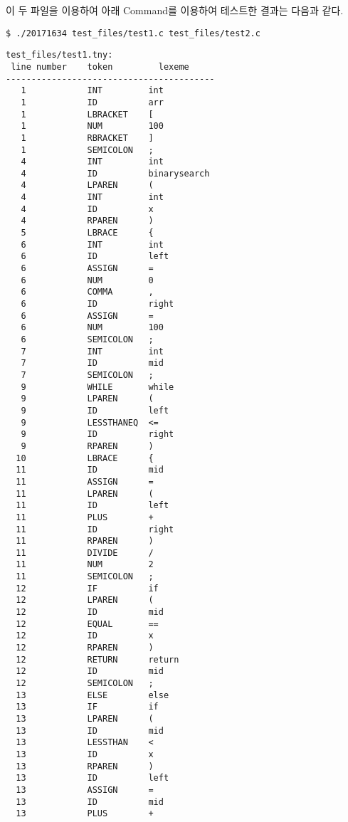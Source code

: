 \documentclass[a4paper, 10pt]{oblivoir}
\begin{document}



이 두 파일을 이용하여 아래 Command를 이용하여 테스트한 결과는 다음과 같다.
\begin{lstlisting}
$ ./20171634 test_files/test1.c test_files/test2.c
\end{lstlisting}

\begin{lstlisting}[caption=Output, frame=single]
test_files/test1.tny:
 line number    token         lexeme    
-----------------------------------------
   1            INT         int
   1            ID          arr
   1            LBRACKET    [
   1            NUM         100
   1            RBRACKET    ]
   1            SEMICOLON   ;
   4            INT         int
   4            ID          binarysearch
   4            LPAREN      (
   4            INT         int
   4            ID          x
   4            RPAREN      )
   5            LBRACE      {
   6            INT         int
   6            ID          left
   6            ASSIGN      =
   6            NUM         0
   6            COMMA       ,
   6            ID          right
   6            ASSIGN      =
   6            NUM         100
   6            SEMICOLON   ;
   7            INT         int
   7            ID          mid
   7            SEMICOLON   ;
   9            WHILE       while
   9            LPAREN      (
   9            ID          left
   9            LESSTHANEQ  <=
   9            ID          right
   9            RPAREN      )
  10            LBRACE      {
  11            ID          mid
  11            ASSIGN      =
  11            LPAREN      (
  11            ID          left
  11            PLUS        +
  11            ID          right
  11            RPAREN      )
  11            DIVIDE      /
  11            NUM         2
  11            SEMICOLON   ;
  12            IF          if
  12            LPAREN      (
  12            ID          mid
  12            EQUAL       ==
  12            ID          x
  12            RPAREN      )
  12            RETURN      return
  12            ID          mid
  12            SEMICOLON   ;
  13            ELSE        else
  13            IF          if
  13            LPAREN      (
  13            ID          mid
  13            LESSTHAN    <
  13            ID          x
  13            RPAREN      )
  13            ID          left
  13            ASSIGN      =
  13            ID          mid
  13            PLUS        +

\end{lstlisting}
\end{document}
